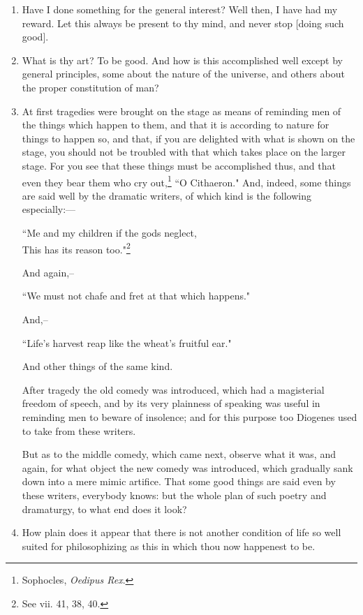 \begin{enumerate}
\item Have I done something for the general interest? Well then, I have had my reward. Let this always be present to thy mind, and never stop [{\clarify doing such good}].

\item What is thy art? To be good. And how is this accomplished well except by general principles, some about the nature of the universe, and others about the proper constitution of man?

\item At first tragedies were brought on the stage as means of reminding men of the things which happen to them, and that it is according to nature for things to happen so, and that, if you are delighted with what is shown on the stage, you should not be troubled with that which takes place on the larger stage. For you see that these things must be accomplished thus, and that even they bear them who cry out,\footnote{Sophocles, \textit{Oedipus Rex}.} ``O Cithaeron." And, indeed, some things are said well by the dramatic writers, of which kind is the following especially:—
\begin{displayquote}
``Me and my children if the gods neglect, \\
This has its reason too."\footnote{See vii. 41, 38, 40.}
\end{displayquote}
And again,--
\begin{displayquote}
``We must not chafe and fret at that which happens."
\end{displayquote}
And,--
\begin{displayquote}
``Life's harvest reap like the wheat's fruitful ear."
\end{displayquote}
And other things of the same kind.

After tragedy the old comedy was introduced, which had a magisterial freedom of speech, and by its very plainness of speaking was useful in reminding men to beware of insolence; and for this purpose too Diogenes used to take from these writers.

But as to the middle comedy, which came next, observe what it was, and again, for what object the new comedy was introduced, which gradually sank down into a mere mimic artifice. That some good things are said even by these writers, everybody knows: but the whole plan of such poetry and dramaturgy, to what end does it look?

\item How plain does it appear that there is not another condition of life so well suited for philosophizing as this in which thou now happenest to be.


\end{enumerate}
